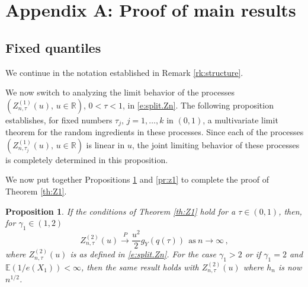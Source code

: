 \documentclass[12pt]{amsart}
\newcommand{\bbr}{\mathbb{R}}
\newcommand{\1}{\mathbbm{1}}
\newcommand{\0}{\mathbf{0}}
\newcommand{\E}{\mathbb{E}}
\theoremstyle{plain}
\newtheorem{proposition}[theorem]{Proposition}
\theoremstyle{definition}
\newcommand{\cip}{\overset{P}\to}
\begin{document}
\section{Appendix A: Proof of main results}
\label{sec:appendix}

\subsection{Fixed quantiles}

We continue in the notation established in Remark \ref{rk:structure}.

We now switch to analyzing the limit behavior of the
processes $(Z^{(1)}_{n,\tau}(u), \,
u\in\bbr)$, $0<\tau<1$, in \eqref{e:split.Zn}.   The following proposition establishes, for fixed numbers $\tau_j, \, j=1,\ldots, k$  in $(0,1)$,  a multivariate
limit theorem for the random ingredients in these processes. 
Since each of the processes $(Z^{(1)}_{n,\tau_j}(u), \,
u\in\bbr)$  is linear in $u$, the joint limiting
behavior of these processes is completely determined in this proposition.

We now put together Propositions \ref{pr:z2} and \ref{pr:z1} to complete the proof of Theorem \ref{th:Z1}. 


\begin{proposition} \label{pr:z2}
 If the conditions of Theorem \ref{th:Z1} hold for a  $\tau\in (0,1)$,  then, for $\gamma_1\in(1,2)$
  $$
  Z_{n,\tau}^{(2)}(u)\cip \frac{u^2}{2}g_Y(q(\tau))~~\mbox {as} \ n\to\infty\,, 
  $$
  where $Z_{n,\tau}^{(2)}(u)$ is as defined in \eqref{e:split.Zn}.  For the case $\gamma_1> 2$ or if $\gamma_1=2$ and $\E(1/e(X_1))<\infty$, then the same result holds with $Z_{n,\tau}^{(2)}(u)$ where $h_n$ is now $n^{1/2}$.
  
\end{proposition}
\end{document}
